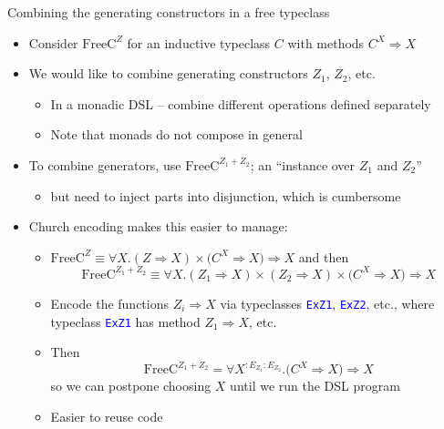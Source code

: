 \documentclass[english,,russian]{beamer}
\begin{document}
\begin{frame}{Combining the generating constructors in a free typeclass}
\begin{itemize}
\item Consider $\text{FreeC}^{Z}$ for an inductive typeclass $C$ with
methods $C^{X}\Rightarrow X$
\item We would like to combine generating constructors $Z_{1}$, $Z_{2}$,
etc.
\begin{itemize}
\item In a monadic DSL -- combine different operations defined separately
\item Note that monads do not compose in general
\end{itemize}
\item To combine generators, use $\text{FreeC}^{Z_{1}+Z_{2}}$; an ``instance
over $Z_{1}$ and $Z_{2}$''
\begin{itemize}
\item but need to inject parts into disjunction, which is cumbersome
\end{itemize}
\item Church encoding makes this easier to manage:
\begin{itemize}
\item {\footnotesize{}$\text{FreeC}^{Z}\equiv\forall X.\left(Z\Rightarrow X\right)\times\big(C^{X}\Rightarrow X\big)\Rightarrow X$}
and then {\footnotesize{}
\[
\text{FreeC}^{Z_{1}+Z_{2}}\equiv\forall X.\left(Z_{1}\Rightarrow X\right)\times\left(Z_{2}\Rightarrow X\right)\times\big(C^{X}\Rightarrow X\big)\Rightarrow X
\]
}{\footnotesize\par}
\item Encode the functions $Z_{i}\Rightarrow X$ via typeclasses \texttt{\textcolor{blue}{\footnotesize{}ExZ1}},
\texttt{\textcolor{blue}{\footnotesize{}ExZ2}}, etc., where typeclass
\texttt{\textcolor{blue}{\footnotesize{}ExZ1}} has method $Z_{1}\Rightarrow X$,
etc.
\item Then {\footnotesize{}
\[
\text{FreeC}^{Z_{1}+Z_{2}}=\forall X^{:E_{Z_{1}}:E_{Z_{2}}}.\big(C^{X}\Rightarrow X\big)\Rightarrow X
\]
}so we can postpone choosing $X$ until we run the DSL program
\item Easier to reuse code
\end{itemize}
\end{itemize}
\end{frame}
\end{document}

